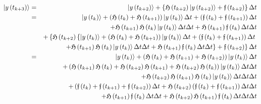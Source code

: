 \begin{eqnarray}
\left| y\left( t_{k+3}\right) \right\rangle &=&\left| y\left( t_{k+2}\right)
\right\rangle +\left\{ {\frak H}\left( t_{k+2}\right) \left| y\left(
t_{k+2}\right) \right\rangle +{\frak f}\left( t_{k+2}\right) \right\} \Delta
t  \nonumber \\
&=&\left| y\left( t_{k}\right) \right\rangle +\left( {\frak H}\left(
t_{k}\right) +{\frak H}\left( t_{k+1}\right) \right) \left| y\left(
t_{k}\right) \right\rangle \Delta t+\left( {\frak f}\left( t_{k}\right) +%
{\frak f}\left( t_{k+1}\right) \right) \Delta t  \nonumber \\
&&+{\frak H}\left( t_{k+1}\right) {\frak H}\left( t_{k}\right) \left|
y\left( t_{k}\right) \right\rangle \Delta t\Delta t+{\frak H}\left(
t_{k+1}\right) {\frak f}\left( t_{k}\right) \Delta t\Delta t  \nonumber \\
&&+\left\{ {\frak H}\left( t_{k+2}\right) \left\{ \left| y\left(
t_{k}\right) \right\rangle +\left( {\frak H}\left( t_{k}\right) +{\frak H}%
\left( t_{k+1}\right) \right) \left| y\left( t_{k}\right) \right\rangle
\Delta t+\left( {\frak f}\left( t_{k}\right) +{\frak f}\left( t_{k+1}\right)
\right) \Delta t\right. \right.  \nonumber \\
&&\left. \left. +{\frak H}\left( t_{k+1}\right) {\frak H}\left( t_{k}\right)
\left| y\left( t_{k}\right) \right\rangle \Delta t\Delta t+{\frak H}\left(
t_{k+1}\right) {\frak f}\left( t_{k}\right) \Delta t\Delta t\right\} +{\frak %
f}\left( t_{k+2}\right) \right\} \Delta t  \nonumber \\
&=&\left| y\left( t_{k}\right) \right\rangle +\left( {\frak H}\left(
t_{k}\right) +{\frak H}\left( t_{k+1}\right) +{\frak H}\left( t_{k+2}\right)
\right) \left| y\left( t_{k}\right) \right\rangle \Delta t  \nonumber \\
&&+\left( {\frak H}\left( t_{k+1}\right) {\frak H}\left( t_{k}\right) +%
{\frak H}\left( t_{k+2}\right) {\frak H}\left( t_{k+1}\right) +{\frak H}%
\left( t_{k+2}\right) {\frak H}\left( t_{k}\right) \right) \left| y\left(
t_{k}\right) \right\rangle \Delta t\Delta t  \nonumber \\
&&+{\frak H}\left( t_{k+2}\right) {\frak H}\left( t_{k+1}\right) {\frak H}%
\left( t_{k}\right) \left| y\left( t_{k}\right) \right\rangle \Delta t\Delta
t\Delta t  \nonumber \\
&&+\left( {\frak f}\left( t_{k}\right) +{\frak f}\left( t_{k+1}\right) +%
{\frak f}\left( t_{k+2}\right) \right) \Delta t+{\frak H}\left(
t_{k+2}\right) \left( {\frak f}\left( t_{k}\right) +{\frak f}\left(
t_{k+1}\right) \right) \Delta t\Delta t  \nonumber \\
&&+{\frak H}\left( t_{k+1}\right) {\frak f}\left( t_{k}\right) \Delta
t\Delta t+{\frak H}\left( t_{k+2}\right) {\frak H}\left( t_{k+1}\right) 
{\frak f}\left( t_{k}\right) \Delta t\Delta t\Delta t
\end{eqnarray}%
